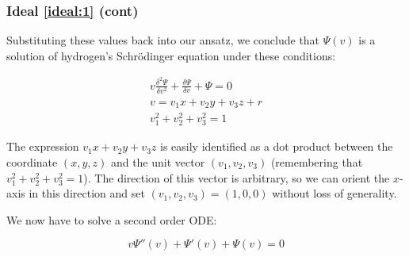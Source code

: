 \documentclass{beamer}
\begin{document}
\begin{frame}
\frametitle{Ideal \eqref{ideal:1} (cont)}

Substituting these values back into our ansatz, we conclude that $\Psi(v)$
is a solution of hydrogen's Schr\"odinger equation under these conditions:

\begin{equation}
\label{related solution}
\begin{gathered}
v \frac{\delta^2\Psi}{\delta v^2} + \frac{\delta\Psi}{\delta v} + \Psi = 0 \\
v = v_1 x+ v_2 y+ v_3 z+r \\
v_1^2 + v_2^2 + v_3^2 = 1
\end{gathered}
\end{equation}

The expression $v_1 x + v_2 y + v_3 z$ is easily identified as a dot product between
the coordinate $(x,y,z)$ and the unit vector $(v_1, v_2, v_3)$ (remembering
that $v_1^2 + v_2^2 + v_3^2 = 1$).  The direction of this vector is arbitrary,
so we can orient the $x$-axis in this direction and set $(v_1, v_2, v_3) = (1,0,0)$
without loss of generality.

We now have to solve a second order ODE:

\begin{equation}
v \Psi''(v) + \Psi'(v) + \Psi(v) = 0
\end{equation}

\end{frame}
\end{document}
